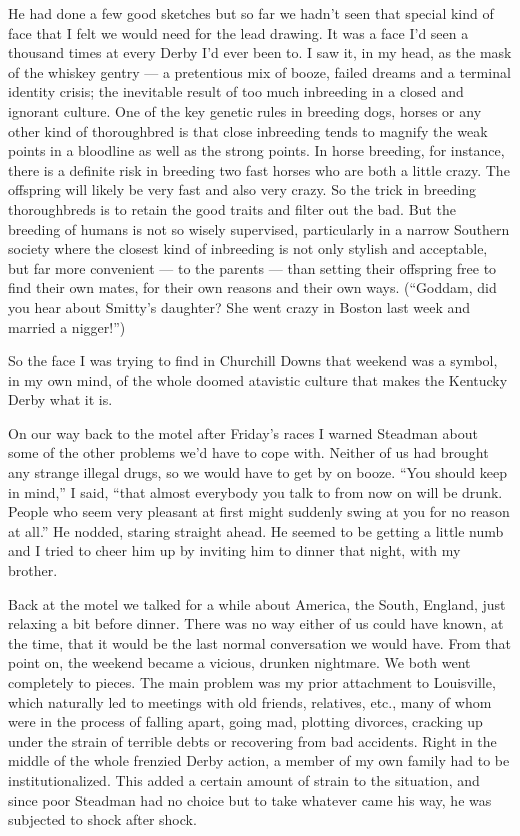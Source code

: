 \documentclass[9pt,a4paper]{extarticle}
\begin{document}
He had done a few good sketches but so far we hadn’t seen that special kind of face that I felt we would need for the lead drawing. It was a face I’d seen a thousand times at every Derby I’d ever been to. I saw it, in my head, as the mask of the whiskey gentry — a pretentious mix of booze, failed dreams and a terminal identity crisis; the inevitable result of too much inbreeding in a closed and ignorant culture. One of the key genetic rules in breeding dogs, horses or any other kind of thoroughbred is that close inbreeding tends to magnify the weak points in a bloodline as well as the strong points. In horse breeding, for instance, there is a definite risk in breeding two fast horses who are both a little crazy. The offspring will likely be very fast and also very crazy. So the trick in breeding thoroughbreds is to retain the good traits and filter out the bad. But the breeding of humans is not so wisely supervised, particularly in a narrow Southern society where the closest kind of inbreeding is not only stylish and acceptable, but far more convenient — to the parents — than setting their offspring free to find their own mates, for their own reasons and their own ways. (“Goddam, did you hear about Smitty’s daughter? She went crazy in Boston last week and married a nigger!”)

So the face I was trying to find in Churchill Downs that weekend was a symbol, in my own mind, of the whole doomed atavistic culture that makes the Kentucky Derby what it is.

On our way back to the motel after Friday’s races I warned Steadman about some of the other problems we’d have to cope with. Neither of us had brought any strange illegal drugs, so we would have to get by on booze. “You should keep in mind,” I said, “that almost everybody you talk to from now on will be drunk. People who seem very pleasant at first might suddenly swing at you for no reason at all.” He nodded, staring straight ahead. He seemed to be getting a little numb and I tried to cheer him up by inviting him to dinner that night, with my brother.

Back at the motel we talked for a while about America, the South, England, just relaxing a bit before dinner. There was no way either of us could have known, at the time, that it would be the last normal conversation we would have. From that point on, the weekend became a vicious, drunken nightmare. We both went completely to pieces. The main problem was my prior attachment to Louisville, which naturally led to meetings with old friends, relatives, etc., many of whom were in the process of falling apart, going mad, plotting divorces, cracking up under the strain of terrible debts or recovering from bad accidents. Right in the middle of the whole frenzied Derby action, a member of my own family had to be institutionalized. This added a certain amount of strain to the situation, and since poor Steadman had no choice but to take whatever came his way, he was subjected to shock after shock.
\end{document}
